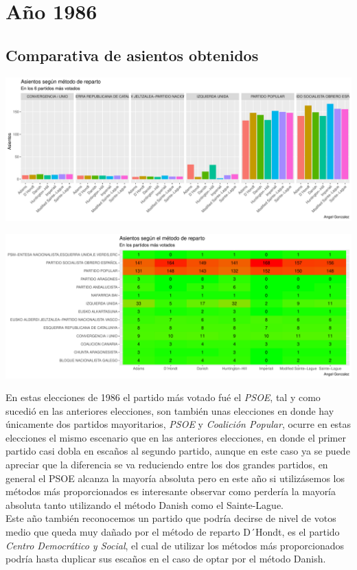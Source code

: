 \documentclass[12pt,a4paper,]{book}
\numberwithin{dummy}{section}
\theoremstyle{ocrenumbox}
\theoremstyle{blacknumex}
\theoremstyle{blacknumbox}
\theoremstyle{ocrenum}
\theoremstyle{ocrenum}
\begin{document}
\hypertarget{auxf1o-1986}{%
\section{Año 1986}\label{auxf1o-1986}}

\hypertarget{comparativa-de-asientos-obtenidos-3}{%
\subsection{Comparativa de asientos
obtenidos}\label{comparativa-de-asientos-obtenidos-3}}

\begin{center}\includegraphics[width=1\linewidth]{figurasR/unnamed-chunk-82-1} \end{center}

\begin{center}\includegraphics[width=1\linewidth]{figurasR/unnamed-chunk-82-2} \end{center}

En estas elecciones de 1986 el partido más votado fué el \emph{PSOE},
tal y como sucedió en las anteriores elecciones, son también unas
elecciones en donde hay únicamente dos partidos mayoritarios,
\emph{PSOE} y \emph{Coalición Popular}, ocurre en estas elecciones el
mismo escenario que en las anteriores elecciones, en donde el primer
partido casi dobla en escaños al segundo partido, aunque en este caso ya
se puede apreciar que la diferencia se va reduciendo entre los dos
grandes partidos, en general el PSOE alcanza la mayoría absoluta pero en
este año si utilizásemos los métodos más proporcionados es interesante
observar como perdería la mayoría absoluta tanto utilizando el método
Danish como el Sainte-Lague.\\
Este año también reconocemos un partido que podría decirse de nivel de
votos medio que queda muy dañado por el método de reparto D´Hondt, es el
partido \emph{Centro Democrático y Social}, el cual de utilizar los
métodos más proporcionados podría hasta duplicar sus escaños en el caso
de optar por el método Danish.
\end{document}
